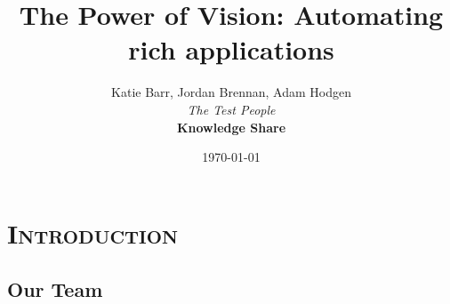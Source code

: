 \documentclass[xcolor=x11names,compress]{beamer}
\renewcommand{\(}{\begin{columns}}
\renewcommand{\)}{\end{columns}}
\newcommand{\<}[1]{\begin{column}{#1}}
\renewcommand{\>}{\end{column}}
\begin{document}
\begin{frame}
\title{The Power of Vision: \n Automating rich applications}    
\author{Katie Barr, Jordan Brennan, Adam Hodgen \\
{\it The Test People}\\   \vspace{3mm}  
\textbf{ \small Knowledge Share}\\
}             %
\date{\today}
\titlepage
\end{frame}


\section{ \scshape Introduction}

\subsection{Our Team}
\begin{frame}

\frametitle{}

\end{frame}

\subsection{}
\begin{frame}
\frametitle{}


\end{frame}

\begin{frame}
\frametitle{}

 
\end{frame}

\begin{frame}
\frametitle{}
\end{frame}

\begin{frame}
\frametitle{}
\end{frame}
 
\begin{frame}
\frametitle{}

\end{frame}


\begin{frame}
\frametitle{}

\end{frame}
\end{document}
